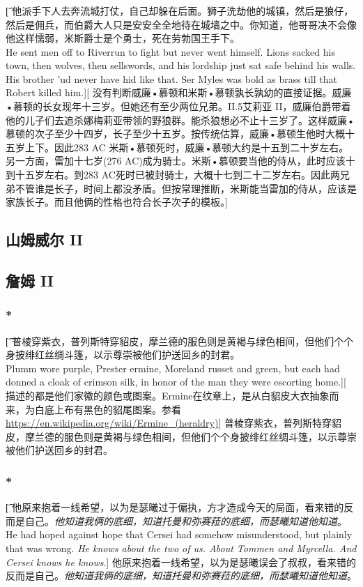 \documentclass[12pt,a4paper]{article}
\begin{document}
\subsubsection{}\t[
	他派手下人去奔流城打仗，自己却躲在后面。狮子洗劫他的城镇，然后是狼仔，然后是佣兵，而伯爵大人只是安安全全地待在城墙之中。你知道，他哥哥决不会像他这样懦弱，米斯爵士是个勇士，死在劳勃国王手下。\\
	He sent men off to Riverrun to fight but never went himself. Lions sacked his town, then wolves, then sellswords, and his lordship just sat safe behind his walls. His brother 'ud never have hid like that. Ser Myles was bold as brass till that Robert killed him.][
	没有判断威廉•慕顿和米斯•慕顿孰长孰幼的直接证据。威廉•慕顿的长女现年十三岁。但她还有至少两位兄弟。II.5艾莉亚 II，威廉伯爵带着他的儿子们去追杀娜梅莉亚带领的野狼群。能杀狼想必不止十三岁了。这样威廉•慕顿的次子至少十四岁，长子至少十五岁。按传统估算，威廉•慕顿生他时大概十五岁上下。因此283 AC 米斯•慕顿死时，威廉•慕顿大约是十五到二十岁左右。另一方面，雷加十七岁(276 AC)成为骑士。米斯•慕顿要当他的侍从，此时应该十到十五岁左右。到283 AC死时已被封骑士，大概十七到二十二岁左右。因此两兄弟不管谁是长子，时间上都没矛盾。但按常理推断，米斯能当雷加的侍从，应该是家族长子。而且他俩的性格也符合长子次子的模板。]
	
\subsection{山姆威尔 II}

\subsection{詹姆 II}
\subsubsection{\color{red}*}\t[
	普棱穿紫衣，普列斯特穿貂皮，摩兰德的服色则是黄褐与绿色相间，但他们个个身披绯红丝绸斗篷，以示尊崇被他们护送回乡的封君。\\
	Plumm wore purple, Prester ermine, Moreland russet and green, but each had donned a cloak of crimson silk, in honor of the man they were escorting home.][
	描述的都是他们家徽的颜色或图案。Ermine在纹章上，是从白貂皮大衣抽象而来，为白底上布有黑色的貂尾图案。参看\url{https://en.wikipedia.org/wiki/Ermine_(heraldry)}]
	普棱穿紫衣，普列斯特穿貂皮，摩兰德的服色则是黄褐与绿色相间，但他们个个身披绯红丝绸斗篷，以示尊崇被他们护送回乡的封君。

\subsubsection{\color{red}*}\t[
	他原来抱着一线希望，以为是瑟曦过于偏执，方才造成今天的局面，看来错的反而是自己。\emph{他知道我俩的底细，知道托曼和弥赛菈的底细，而瑟曦知道他知道}。\\
	He had hoped against hope that Cersei had somehow misunderstood, but plainly that was wrong. \emph{He knows about the two of us. About Tommen and Myrcella. And Cersei knows he knows}.]
	他原来抱着一线希望，以为是瑟曦误会了叔叔，看来错的反而是自己。\emph{他知道我俩的底细，知道托曼和弥赛菈的底细，而瑟曦知道他知道}。
	
\end{document}
